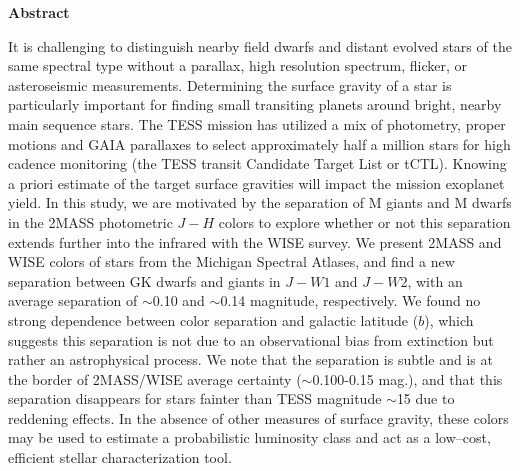 {}
\vspace*{\fill}
\begin{center}
\textbf{Abstract}

It is challenging to distinguish nearby field dwarfs and distant evolved stars of the same spectral type without a parallax, high resolution spectrum, flicker, or asteroseismic measurements. Determining the surface gravity of a star is particularly important for finding small transiting planets around bright, nearby main sequence stars. The TESS mission has utilized a mix of photometry, proper motions and GAIA parallaxes to select approximately half a million stars for high cadence monitoring (the TESS transit Candidate Target List or tCTL). Knowing a priori estimate of the target surface gravities will impact the mission exoplanet yield.  In this study, we are motivated by the separation of M giants and M dwarfs in the 2MASS photometric $J-H$ colors to explore whether or not this separation extends further into the infrared with the WISE survey. We present 2MASS and WISE colors of \bincount stars from the Michigan Spectral Atlases, and find a new separation between GK dwarfs and giants in $J-W{1}$ and $J-W{2}$, with an average separation of $\sim$0.10 and $\sim$0.14 magnitude, respectively. We found no strong dependence between color separation and galactic latitude ($b$), which suggests this separation is not due to an observational bias from extinction but rather an astrophysical process. We note that the separation is subtle and is at the border of 2MASS/WISE average certainty ($\sim$0.100-0.15 mag.), and that this separation disappears for stars fainter than TESS magnitude $\sim$15 due to reddening effects. In the absence of other measures of surface gravity, these colors may be used to estimate a probabilistic luminosity class and act as a low--cost, efficient stellar characterization tool.

\end{center}
\vspace{\fill}
